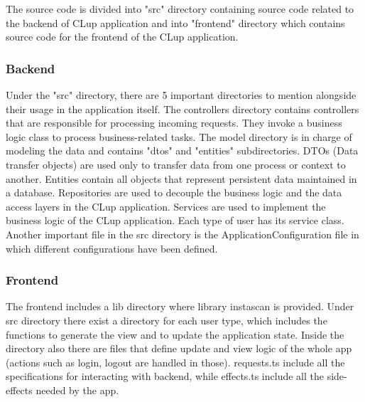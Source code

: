 The source code is divided into "src" directory containing source code related to the backend of CLup application and into "frontend" directory
which contains source code for the frontend of the CLup application.

\subsubsection{Backend}
Under the "src" directory, there are 5 important directories to mention alongside their usage in the application itself.
The controllers directory contains controllers that are responsible for processing incoming requests.
They invoke a business logic class to process business-related tasks.
The model directory is in charge of modeling the data and contains "dtos" and "entities" subdirectories.
DTOs (Data transfer objects) are used only to transfer data from one process or context to another.
Entities contain all objects that represent persistent data maintained in a database.
Repositories are used to decouple the business logic and the data access layers in the CLup application.
Services are used to implement the business logic of the CLup application. Each type of user has its service class.
Another important file in the src directory is the ApplicationConfiguration file in which different configurations have been defined.

\subsubsection{Frontend}
The frontend includes a lib directory where library instascan is provided.
Under src directory there exist a directory for each user type, which includes the functions to generate the view and to update the application state.
Inside the directory also there are files that define update and view logic of the whole app (actions such as login, logout are handled in those).
requests.ts include all the specifications for interacting with backend, while effects.ts include all the side-effects needed by the app.






